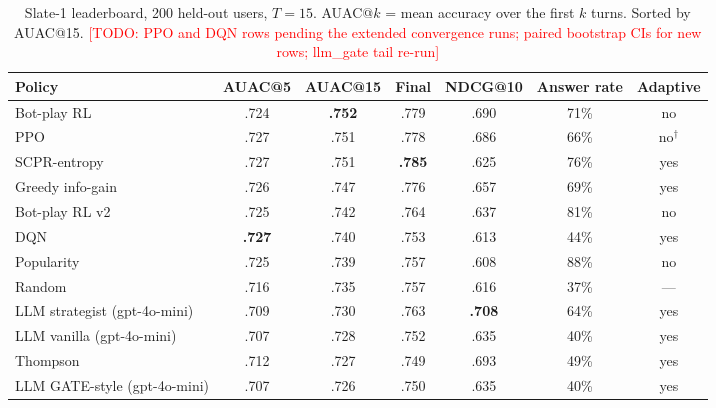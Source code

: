 \documentclass[11pt]{article}
\newcommand{\todo}[1]{\textcolor{red}{[TODO: #1]}}
\begin{document}
\begin{table}[t]
\centering
\caption{Slate-1 leaderboard, 200 held-out users, $T=15$.
AUAC@$k$ = mean accuracy over the first $k$ turns. Sorted by AUAC@15.
\todo{PPO and DQN rows pending the extended convergence runs; paired
bootstrap CIs for new rows; llm\_gate tail re-run}}
\label{tab:leaderboard}
\small
\begin{tabular}{lcccccc}
\toprule
Policy & AUAC@5 & AUAC@15 & Final & NDCG@10 & Answer rate & Adaptive \\
\midrule
Bot-play RL \citep{makarova2024learning} & .724 & \textbf{.752} & .779 & .690 & 71\% & no \\
PPO & .727 & .751 & .778 & .686 & 66\% & no$^{\dagger}$ \\
SCPR-entropy \citep{lei2020interactive} & .727 & .751 & \textbf{.785} & .625 & 76\% & yes \\
Greedy info-gain & .726 & .747 & .776 & .657 & 69\% & yes \\
Bot-play RL v2 & .725 & .742 & .764 & .637 & 81\% & no \\
DQN \citep{deng2021unified} & \textbf{.727} & .740 & .753 & .613 & 44\% & yes \\
Popularity & .725 & .739 & .757 & .608 & 88\% & no \\
Random & .716 & .735 & .757 & .616 & 37\% & --- \\
LLM strategist (gpt-4o-mini) & .709 & .730 & .763 & \textbf{.708} & 64\% & yes \\
LLM vanilla (gpt-4o-mini) & .707 & .728 & .752 & .635 & 40\% & yes \\
Thompson \citep{austin2024bayesian} & .712 & .727 & .749 & .693 & 49\% & yes \\
LLM GATE-style (gpt-4o-mini) & .707 & .726 & .750 & .635 & 40\% & yes \\
\bottomrule
\end{tabular}
\end{table}
\end{document}
